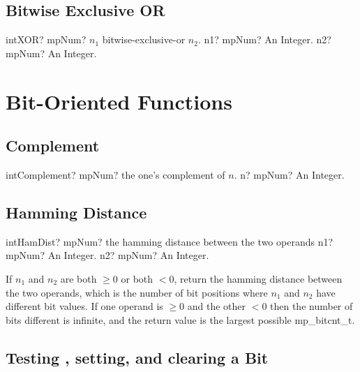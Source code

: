 \subsection{Bitwise Exclusive OR}

\begin{mpFunctionsExtract}
	\mpFunctionTwo
	{intXOR? mpNum? $n_1$ bitwise-exclusive-or $n_2$.}
	{n1? mpNum? An Integer.}
	{n2? mpNum? An Integer.}
\end{mpFunctionsExtract}








\section{Bit-Oriented Functions}
\label{BitOrientedFunctions}


\subsection{Complement}

\begin{mpFunctionsExtract}
	\mpFunctionOne
	{intComplement? mpNum? the one's complement of $n$.}
	{n? mpNum? An Integer.}
\end{mpFunctionsExtract}




\subsection{Hamming Distance}

\begin{mpFunctionsExtract}
	\mpFunctionTwo
	{intHamDist? mpNum? the hamming distance between the two operands}
	{n1? mpNum? An Integer.}
	{n2? mpNum? An Integer.}
\end{mpFunctionsExtract}

\vspace{0.3cm}
If $n_1$ and $n_2$ are both $\geq 0$ or both $< 0$, return the hamming distance between the two operands, which is the number of bit positions where $n_1$ and $n_2$ have different bit values. If one operand is $\geq 0$ and the other $< 0$ then the number of bits different is infinite, and the return value is the largest possible mp\_bitcnt\_t.



\subsection{Testing , setting, and clearing a Bit}

